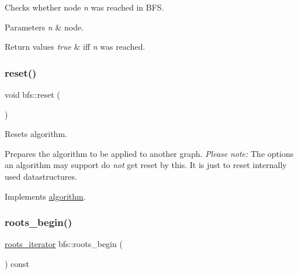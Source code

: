 Checks whether node {\itshape n} was reached in B\+FS. 


\begin{DoxyParams}{Parameters}
{\em n} & node. \\
\hline
\end{DoxyParams}

\begin{DoxyRetVals}{Return values}
{\em true} & iff {\itshape n} was reached. \\
\hline
\end{DoxyRetVals}
\mbox{\label{classbfs_a6398bc230f9723cd5fdd32cd603647cc}} 
\subsubsection{\texorpdfstring{reset()}{reset()}}
{\footnotesize\ttfamily void bfs\+::reset (\begin{DoxyParamCaption}{ }\end{DoxyParamCaption})\hspace{0.3cm}{\ttfamily [virtual]}}



Resets algorithm. 

Prepares the algorithm to be applied to another graph. {\itshape Please} {\itshape note\+:} The options an algorithm may support do {\itshape not} get reset by this. It is just to reset internally used datastructures. 

Implements \mbox{\hyperlink{classalgorithm_a21aba63d066ae7897de6ca7d8425c408}{algorithm}}.

\mbox{\label{classbfs_a45d58d06d0dcd6427edad2ec52a6ebb9}} 
\subsubsection{\texorpdfstring{roots\+\_\+begin()}{roots\_begin()}}
{\footnotesize\ttfamily \mbox{\hyperlink{classbfs_a386ac6f3c63e38c3f5263e15c3ab9d01}{roots\+\_\+iterator}} bfs\+::roots\+\_\+begin (\begin{DoxyParamCaption}{ }\end{DoxyParamCaption}) const\hspace{0.3cm}{\ttfamily [inline]}}




